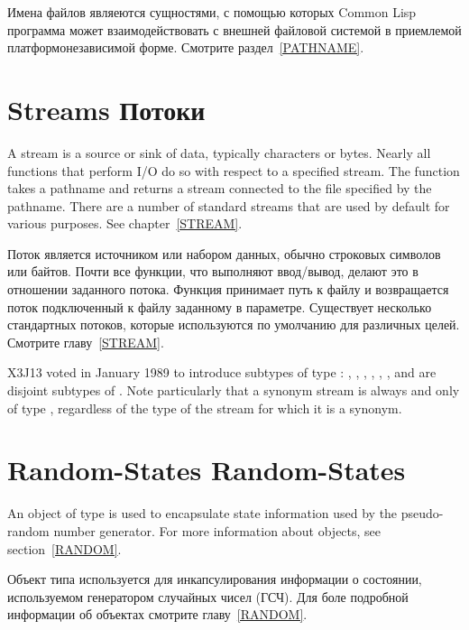 Имена файлов являеются сущностями, с помощью которых Common Lisp программа может
взаимодействовать с внешней файловой системой в приемлемой платформонезависимой
форме. Смотрите раздел~\ref{PATHNAME}.

\section{Streams Потоки}

A stream is a source or sink of data, typically characters or bytes.
Nearly all functions that perform I/O do so with respect to a specified
stream.  The function  takes a pathname and returns a stream
connected to the file specified by the pathname.
There are a number of standard streams that are used by default for
various purposes.  See chapter~\ref{STREAM}.

Поток является источником или набором данных, обычно строковых символов или
байтов. Почти все функции, что выполняют ввод/вывод, делают это в отношении
заданного потока. Функция  принимает путь к файлу и возвращается поток
подключенный к файлу заданному в параметре.
Существует несколько стандартных потоков, которые используются по умолчанию для
различных целей. Смотрите главу~\ref{STREAM}.

\begin{newer}
X3J13 voted in January 1989
to introduce subtypes of type :
, ,
, , , ,
and  are disjoint subtypes of .
Note particularly that a synonym stream is always and only of type
, regardless of the type of the stream for which it is a synonym.
\end{newer}

\section{Random-States Random-States}

An object of type  is used to encapsulate
state information used by the pseudo-random number generator.
For more information about  objects,
see section~\ref{RANDOM}.

Объект типа  используется для инкапсулирования информации о
состоянии, используемом генератором случайных чисел (ГСЧ). Для боле подробной
информации об объектах  смотрите главу~\ref{RANDOM}.

